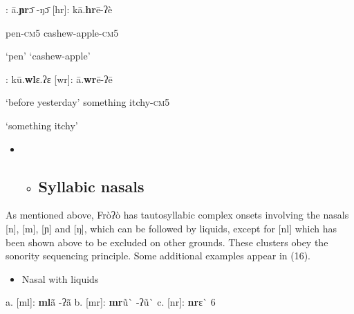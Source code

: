 \begin{styleindexi}
            [ɲr]:   ā.\textbf{ɲr}ɔ\={} -ŋɔ\={}                                       [hr]:    kā.\textbf{hr}ē-ʔè           
\end{styleindexi}

\begin{styleindexi}
                    pen-\textsc{cm}5                                                cashew-apple-\textsc{cm}5   
\end{styleindexi}

\begin{styleindexi}
                    ‘pen’                                                     ‘cashew-apple’
\end{styleindexi}

\begin{styleindexi}
            [wl]:  kū.\textbf{wl}ɛ.ʔɛ                                      [wr]:    ā.\textbf{wr}ē-ʔē           
\end{styleindexi}

\begin{styleindexi}
                    ‘before yesterday’                                  something itchy-\textsc{cm}5
\end{styleindexi}

\begin{styleindexi}
                                                                              ‘something itchy’
\end{styleindexi}

\begin{itemize}
\item \begin{itemize}
\item \subsection{ Syllabic nasals}\end{itemize}
\end{itemize}

As mentioned above, Fròʔò has tautosyllabic complex onsets involving the nasals [n], [m], [ɲ] and [ŋ], which can be followed by liquids, except for [nl] which has been shown above to be excluded on other grounds. These clusters obey the sonority sequencing principle. Some additional examples appear in (16).

\begin{itemize}
\item \begin{styleindexi}
    \label{bkm:Ref499275465}Nasal with liquids 
\end{styleindexi}\end{itemize}
\begin{styleindexi}
          a.  [ml]:       \textbf{ml}ã\={} -ʔã\={}               b.  [mr]:       \textbf{mr}ũ\`{} -ʔũ\`{}                  c.  [nr]:      \textbf{nr}ɛ\`{} 6~       
\end{styleindexi}

